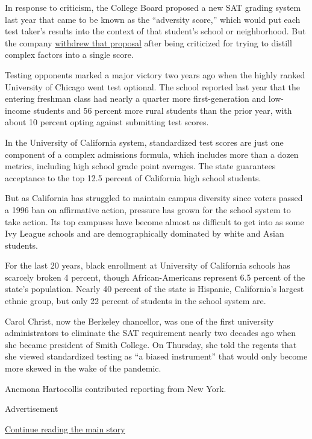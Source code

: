 In response to criticism, the College Board proposed a new SAT grading
system last year that came to be known as the ``adversity score,'' which
would put each test taker's results into the context of that student's
school or neighborhood. But the company
\href{https://www.nytimes.com/2019/08/27/us/sat-adversity-score-college-board.html}{withdrew
that proposal} after being criticized for trying to distill complex
factors into a single score.

Testing opponents marked a major victory two years ago when the highly
ranked University of Chicago went test optional. The school reported
last year that the entering freshman class had nearly a quarter more
first-generation and low-income students and 56 percent more rural
students than the prior year, with about 10 percent opting against
submitting test scores.

In the University of California system, standardized test scores are
just one component of a complex admissions formula, which includes more
than a dozen metrics, including high school grade point averages. The
state guarantees acceptance to the top 12.5 percent of California high
school students.

But as California has struggled to maintain campus diversity since
voters passed a 1996 ban on affirmative action, pressure has grown for
the school system to take action. Its top campuses have become almost as
difficult to get into as some Ivy League schools and are demographically
dominated by white and Asian students.

For the last 20 years, black enrollment at University of California
schools has scarcely broken 4 percent, though African-Americans
represent 6.5 percent of the state's population. Nearly 40 percent of
the state is Hispanic, California's largest ethnic group, but only 22
percent of students in the school system are.

Carol Christ, now the Berkeley chancellor, was one of the first
university administrators to eliminate the SAT requirement nearly two
decades ago when she became president of Smith College. On Thursday, she
told the regents that she viewed standardized testing as ``a biased
instrument'' that would only become more skewed in the wake of the
pandemic.

Anemona Hartocollis contributed reporting from New York.

Advertisement

\protect\hyperlink{after-bottom}{Continue reading the main story}

